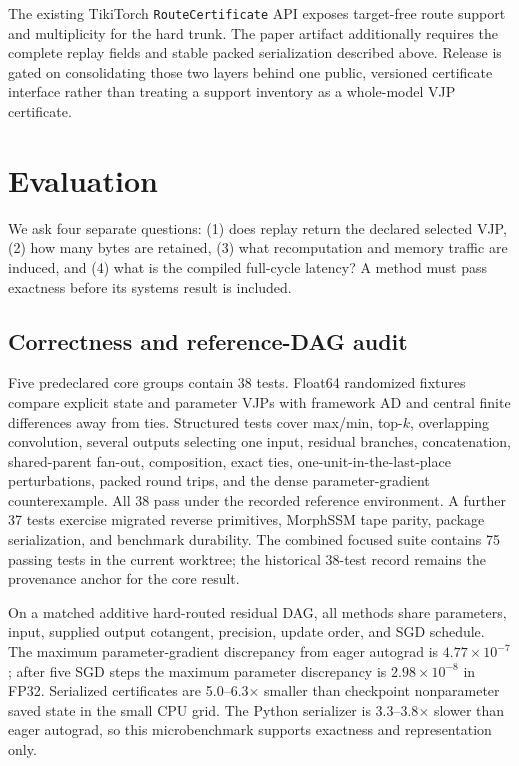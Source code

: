 \documentclass[10pt]{article}
\newcommand{\code}[1]{\texttt{#1}}
\begin{document}
The existing TikiTorch \code{RouteCertificate} API exposes target-free route
support and multiplicity for the hard trunk.  The paper artifact additionally
requires the complete replay fields and stable packed serialization described
above.  Release is gated on consolidating those two layers behind one public,
versioned certificate interface rather than treating a support inventory as a
whole-model VJP certificate.

\section{Evaluation}

We ask four separate questions: (1) does replay return the declared selected
VJP, (2) how many bytes are retained, (3) what recomputation and memory traffic
are induced, and (4) what is the compiled full-cycle latency?  A method must
pass exactness before its systems result is included.

\subsection{Correctness and reference-DAG audit}

Five predeclared core groups contain 38 tests.  Float64 randomized fixtures
compare explicit state and parameter VJPs with framework AD and central finite
differences away from ties.  Structured tests cover max/min, top-$k$,
overlapping convolution, several outputs selecting one input, residual
branches, concatenation, shared-parent fan-out, composition, exact ties,
one-unit-in-the-last-place perturbations, packed round trips, and the dense
parameter-gradient counterexample.  All 38 pass under the recorded reference
environment.  A further 37 tests exercise migrated reverse primitives,
MorphSSM tape parity, package serialization, and benchmark durability.  The
combined focused suite contains 75 passing tests in the current worktree; the
historical 38-test record remains the provenance anchor for the core result.

On a matched additive hard-routed residual DAG, all methods share parameters,
input, supplied output cotangent, precision, update order, and SGD schedule.
The maximum parameter-gradient discrepancy from eager autograd is
$4.77\times10^{-7}$; after five SGD steps the maximum parameter discrepancy is
$2.98\times10^{-8}$ in FP32.  Serialized certificates are 5.0--6.3$\times$
smaller than checkpoint nonparameter saved state in the small CPU grid.  The
Python serializer is 3.3--3.8$\times$ slower than eager autograd, so this
microbenchmark supports exactness and representation only.
\end{document}
